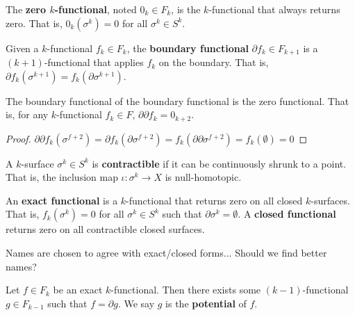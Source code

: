 \begin{defn}
	The \textbf{zero $k$-functional}, noted $0_k \in F_k$, is the $k$-functional that always returns zero. That is, $0_k(\sigma^k) = 0$ for all $\sigma^k \in S^k$.
\end{defn}


\begin{defn}
	Given a $k$-functional $f_k \in F_k$, the \textbf{boundary functional} $\partial f_k \in F_{k+1}$ is a $(k+1)$-functional that applies $f_k$ on the boundary. That is, $\partial f_k(\sigma^{k+1}) = f_k(\partial \sigma^{k+1})$. 
\end{defn}

\begin{coro}
	The boundary functional of the boundary functional is the zero functional. That is, for any $k$-functional $f_k \in F$, $\partial \partial f_k = 0_{k+2}$.
\end{coro}

\begin{proof}
	$\partial \partial f_k (\sigma ^{f+2}) = \partial f_k (\partial \sigma ^{f+2}) = f_k (\partial \partial \sigma ^{f+2}) = f_k(\emptyset) = 0$
\end{proof}

\begin{defn}
	A $k$-surface $\sigma^k \in S^k$ is \textbf{contractible} if it can be continuously shrunk to a point. That is, the inclusion map $\iota : \sigma^k \to X$ is null-homotopic.
\end{defn}

\begin{defn}
	An \textbf{exact functional} is a $k$-functional that returns zero on all closed $k$-surfaces. That is, $f_k(\sigma^k) = 0$ for all $\sigma^k \in S^k$ such that $\partial\sigma^k = \emptyset$. A \textbf{closed functional} returns zero on all contractible closed surfaces.
\end{defn}

\begin{remark}
	Names are chosen to agree with exact/closed forms... Should we find better names?
\end{remark}

\begin{prop}
	Let $f \in F_k$ be an exact $k$-functional. Then there exists some $(k-1)$-functional $g \in F_{k-1}$ such that $f = \partial g$. We say $g$ is the \textbf{potential} of $f$.
\end{prop}

